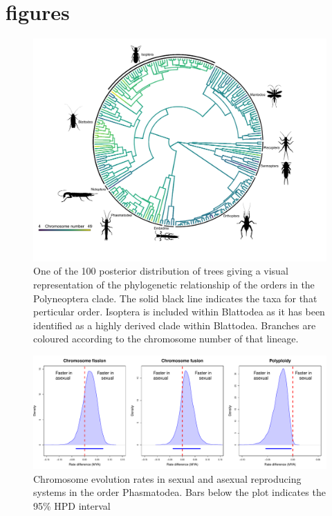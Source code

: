 \section{figures}%

\begin{figure}[h]
\centering \includegraphics[width=1\textwidth]{figures/phylogenetic_tree.pdf}
\caption{
One of the 100 posterior distribution of trees giving a visual representation of the phylogenetic relationship of the orders in the Polyneoptera clade. The solid black line indicates the taxa for that perticular order. Isoptera is included within Blattodea as it has been identified as a highly derived clade within Blattodea. Branches are coloured according to the chromosome number of that lineage. 
}
\label{fig:phyloplot}
\end{figure}

\newpage
\begin{figure}
\centering \includegraphics[width=.7\textwidth]{figures/phasmatodea_sex_asex_plot.pdf}
\caption{Chromosome evolution rates in sexual and asexual reproducing systems in the order Phasmatodea. Bars below the plot indicates the 95\% HPD interval}
\label{fig:phas.plot}
\end{figure}

